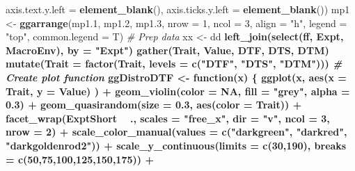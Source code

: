 \documentclass[
]{article}
\newenvironment{Shaded}{\begin{snugshade}}{\end{snugshade}}
\newcommand{\CommentTok}[1]{\textcolor[rgb]{0.56,0.35,0.01}{\textit{#1}}}
\newcommand{\ControlFlowTok}[1]{\textcolor[rgb]{0.13,0.29,0.53}{\textbf{#1}}}
\newcommand{\DataTypeTok}[1]{\textcolor[rgb]{0.13,0.29,0.53}{#1}}
\newcommand{\DecValTok}[1]{\textcolor[rgb]{0.00,0.00,0.81}{#1}}
\newcommand{\FloatTok}[1]{\textcolor[rgb]{0.00,0.00,0.81}{#1}}
\newcommand{\KeywordTok}[1]{\textcolor[rgb]{0.13,0.29,0.53}{\textbf{#1}}}
\newcommand{\NormalTok}[1]{#1}
\newcommand{\OperatorTok}[1]{\textcolor[rgb]{0.81,0.36,0.00}{\textbf{#1}}}
\newcommand{\OtherTok}[1]{\textcolor[rgb]{0.56,0.35,0.01}{#1}}
\newcommand{\StringTok}[1]{\textcolor[rgb]{0.31,0.60,0.02}{#1}}
\begin{document}
\begin{Shaded}
\begin{Highlighting}[]
{{{{{        \DataTypeTok{axis.text.y.left =} \KeywordTok{element_blank}\NormalTok{(),}
        \DataTypeTok{axis.ticks.y.left =} \KeywordTok{element_blank}\NormalTok{())}
\NormalTok{mp1 <-}\StringTok{ }\KeywordTok{ggarrange}\NormalTok{(mp1}\FloatTok{.1}\NormalTok{, mp1}\FloatTok{.2}\NormalTok{, mp1}\FloatTok{.3}\NormalTok{, }\DataTypeTok{nrow =} \DecValTok{1}\NormalTok{, }\DataTypeTok{ncol =} \DecValTok{3}\NormalTok{, }\DataTypeTok{align =} \StringTok{"h"}\NormalTok{,}
                 \DataTypeTok{legend =} \StringTok{"top"}\NormalTok{, }\DataTypeTok{common.legend =}\NormalTok{ T)}
\CommentTok{# Prep data}
\NormalTok{xx <-}\StringTok{ }\NormalTok{dd }\OperatorTok{%
\StringTok{  }\KeywordTok{left_join}\NormalTok{(}\KeywordTok{select}\NormalTok{(ff, Expt, MacroEnv), }\DataTypeTok{by =} \StringTok{"Expt"}\NormalTok{) }\OperatorTok{%
\StringTok{  }\KeywordTok{gather}\NormalTok{(Trait, Value, DTF, DTS, DTM) }\OperatorTok{%
\StringTok{  }\KeywordTok{mutate}\NormalTok{(}\DataTypeTok{Trait =} \KeywordTok{factor}\NormalTok{(Trait, }\DataTypeTok{levels =} \KeywordTok{c}\NormalTok{(}\StringTok{"DTF"}\NormalTok{, }\StringTok{"DTS"}\NormalTok{, }\StringTok{"DTM"}\NormalTok{)))}
\CommentTok{# Create plot function}
\NormalTok{ggDistroDTF <-}\StringTok{ }\ControlFlowTok{function}\NormalTok{(x) \{}
  \KeywordTok{ggplot}\NormalTok{(x, }\KeywordTok{aes}\NormalTok{(}\DataTypeTok{x =}\NormalTok{ Trait, }\DataTypeTok{y =}\NormalTok{ Value) ) }\OperatorTok{+}
\StringTok{    }\KeywordTok{geom_violin}\NormalTok{(}\DataTypeTok{color =} \OtherTok{NA}\NormalTok{, }\DataTypeTok{fill =} \StringTok{"grey"}\NormalTok{, }\DataTypeTok{alpha =} \FloatTok{0.3}\NormalTok{) }\OperatorTok{+}\StringTok{ }
\StringTok{    }\KeywordTok{geom_quasirandom}\NormalTok{(}\DataTypeTok{size =} \FloatTok{0.3}\NormalTok{, }\KeywordTok{aes}\NormalTok{(}\DataTypeTok{color =}\NormalTok{ Trait)) }\OperatorTok{+}
\StringTok{    }\KeywordTok{facet_wrap}\NormalTok{(ExptShort }\OperatorTok{~}\StringTok{ }\NormalTok{., }\DataTypeTok{scales =} \StringTok{"free_x"}\NormalTok{, }\DataTypeTok{dir =} \StringTok{"v"}\NormalTok{, }\DataTypeTok{ncol =} \DecValTok{3}\NormalTok{, }\DataTypeTok{nrow =} \DecValTok{2}\NormalTok{) }\OperatorTok{+}\StringTok{ }
\StringTok{    }\KeywordTok{scale_color_manual}\NormalTok{(}\DataTypeTok{values =} \KeywordTok{c}\NormalTok{(}\StringTok{"darkgreen"}\NormalTok{, }\StringTok{"darkred"}\NormalTok{, }\StringTok{"darkgoldenrod2"}\NormalTok{)) }\OperatorTok{+}
\StringTok{    }\KeywordTok{scale_y_continuous}\NormalTok{(}\DataTypeTok{limits =} \KeywordTok{c}\NormalTok{(}\DecValTok{30}\NormalTok{,}\DecValTok{190}\NormalTok{), }\DataTypeTok{breaks =} \KeywordTok{c}\NormalTok{(}\DecValTok{50}\NormalTok{,}\DecValTok{75}\NormalTok{,}\DecValTok{100}\NormalTok{,}\DecValTok{125}\NormalTok{,}\DecValTok{150}\NormalTok{,}\DecValTok{175}\NormalTok{)) }\OperatorTok{+}
}}}}}}}}
\end{Highlighting}
\end{Shaded}
\end{document}
